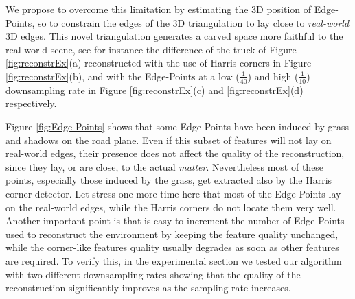We propose to overcome this limitation by estimating the 3D position of Edge-Points, so to constrain the edges of the 3D triangulation to lay close to \emph{real-world} 3D edges. 
This novel triangulation generates a carved space more faithful to the real-world scene, see for instance the difference of the truck of Figure \ref{fig:reconstrEx}(a) reconstructed with the use of Harris corners in Figure \ref{fig:reconstrEx}(b), and with the Edge-Points at a low ($\frac{1}{40}$) and high ($\frac{1}{10}$) downsampling rate  in Figure \ref{fig:reconstrEx}(c) and \ref{fig:reconstrEx}(d) respectively. 

Figure \ref{fig:Edge-Points} shows that some Edge-Points have been induced by grass and shadows on the road plane. Even if this subset of features will not lay on real-world edges, their presence does not affect the quality of the reconstruction, since they lay, or are close, to the actual \emph{matter}.
Nevertheless most of these points, especially those induced by the grass, get extracted also by the Harris corner detector. 
Let stress one more time here that most of the Edge-Points lay on the real-world edges, while the Harris corners do not locate them very well.
Another important point is that is easy to increment the number of Edge-Points used to reconstruct the environment by keeping the feature quality unchanged, while the corner-like features quality usually degrades as soon as other features are required. 
To verify this, in the experimental section we tested our algorithm with two different downsampling rates showing that the quality of the reconstruction significantly improves as the sampling rate increases. 


